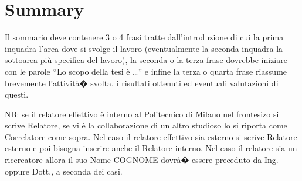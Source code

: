 \newpage
\chapter*{Summary}


Il sommario deve contenere 3 o 4 frasi tratte dall'introduzione di cui la prima inquadra l'area dove si svolge il lavoro (eventualmente la seconda inquadra la sottoarea pi\`u specifica del lavoro), la seconda o la terza frase dovrebbe iniziare con le parole ``Lo scopo della tesi \`e \dots'' e infine la terza o quarta frase riassume brevemente l'attivit\`a� svolta, i risultati ottenuti ed eventuali valutazioni di questi.

\vspace{0.5cm}
\noindent NB: se il relatore effettivo \`e interno al Politecnico di Milano nel frontesizo si scrive Relatore, se vi \`e la collaborazione di un altro studioso lo si riporta come Correlatore come sopra. Nel caso il relatore effettivo sia esterno si scrive Relatore esterno e poi bisogna inserire anche il Relatore interno. Nel caso il relatore sia un ricercatore allora il suo Nome COGNOME dovr\`a� essere preceduto da Ing. oppure Dott., a seconda dei casi.
